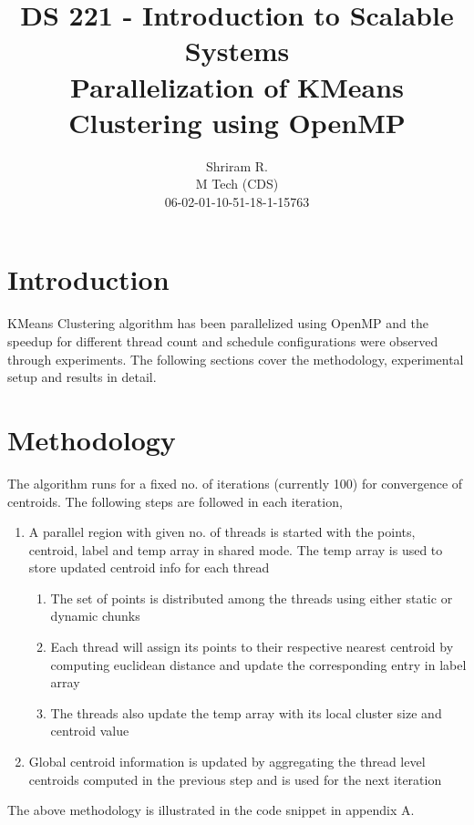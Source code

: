 \documentclass[11pt,a4paper,oneside]{article}
\begin{document}
	\title{DS 221 - Introduction to Scalable Systems \\ Parallelization of KMeans Clustering using OpenMP}
	\author{Shriram R. \\ M Tech (CDS) \\ 06-02-01-10-51-18-1-15763}
	\maketitle
	
	\section{Introduction}
	KMeans Clustering algorithm has been parallelized using OpenMP and the speedup for different thread count and schedule configurations were observed through experiments. The following sections cover the methodology, experimental setup and results in detail.
	
	\section{Methodology}
	The algorithm runs for a fixed no. of iterations (currently 100) for convergence of centroids. The following steps are followed in each iteration,
	\begin{enumerate}
		\item A parallel region with given no. of threads is started with the points, centroid, label and temp array in shared mode. The temp array is used to store updated centroid info for each thread
		\begin{enumerate}
		\item The set of points is distributed among the threads using either static or dynamic chunks
		\item Each thread will assign its points to their respective nearest centroid by computing euclidean distance and update the corresponding entry in label array
		\item The threads also update the temp array with its local cluster size and centroid value
	    \end{enumerate}
		\item Global centroid information is updated by aggregating the thread level centroids computed in the previous step and is used for the next iteration
	\end{enumerate}
    The above methodology is illustrated in the code snippet in appendix A.
	
	
\end{document}
